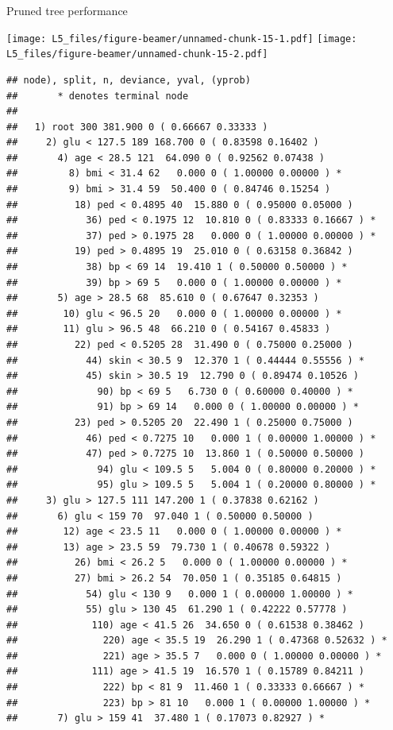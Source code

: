 \documentclass[
  ignorenonframetext,
]{beamer}
\begin{document}
\begin{frame}[fragile]

\begin{block}{Pruned tree performance}

\texttt{[image: L5\_files/figure-beamer/unnamed-chunk-15-1.pdf]}
\texttt{[image: L5\_files/figure-beamer/unnamed-chunk-15-2.pdf]}

\begin{verbatim}
## node), split, n, deviance, yval, (yprob)
##       * denotes terminal node
## 
##   1) root 300 381.900 0 ( 0.66667 0.33333 )  
##     2) glu < 127.5 189 168.700 0 ( 0.83598 0.16402 )  
##       4) age < 28.5 121  64.090 0 ( 0.92562 0.07438 )  
##         8) bmi < 31.4 62   0.000 0 ( 1.00000 0.00000 ) *
##         9) bmi > 31.4 59  50.400 0 ( 0.84746 0.15254 )  
##          18) ped < 0.4895 40  15.880 0 ( 0.95000 0.05000 )  
##            36) ped < 0.1975 12  10.810 0 ( 0.83333 0.16667 ) *
##            37) ped > 0.1975 28   0.000 0 ( 1.00000 0.00000 ) *
##          19) ped > 0.4895 19  25.010 0 ( 0.63158 0.36842 )  
##            38) bp < 69 14  19.410 1 ( 0.50000 0.50000 ) *
##            39) bp > 69 5   0.000 0 ( 1.00000 0.00000 ) *
##       5) age > 28.5 68  85.610 0 ( 0.67647 0.32353 )  
##        10) glu < 96.5 20   0.000 0 ( 1.00000 0.00000 ) *
##        11) glu > 96.5 48  66.210 0 ( 0.54167 0.45833 )  
##          22) ped < 0.5205 28  31.490 0 ( 0.75000 0.25000 )  
##            44) skin < 30.5 9  12.370 1 ( 0.44444 0.55556 ) *
##            45) skin > 30.5 19  12.790 0 ( 0.89474 0.10526 )  
##              90) bp < 69 5   6.730 0 ( 0.60000 0.40000 ) *
##              91) bp > 69 14   0.000 0 ( 1.00000 0.00000 ) *
##          23) ped > 0.5205 20  22.490 1 ( 0.25000 0.75000 )  
##            46) ped < 0.7275 10   0.000 1 ( 0.00000 1.00000 ) *
##            47) ped > 0.7275 10  13.860 1 ( 0.50000 0.50000 )  
##              94) glu < 109.5 5   5.004 0 ( 0.80000 0.20000 ) *
##              95) glu > 109.5 5   5.004 1 ( 0.20000 0.80000 ) *
##     3) glu > 127.5 111 147.200 1 ( 0.37838 0.62162 )  
##       6) glu < 159 70  97.040 1 ( 0.50000 0.50000 )  
##        12) age < 23.5 11   0.000 0 ( 1.00000 0.00000 ) *
##        13) age > 23.5 59  79.730 1 ( 0.40678 0.59322 )  
##          26) bmi < 26.2 5   0.000 0 ( 1.00000 0.00000 ) *
##          27) bmi > 26.2 54  70.050 1 ( 0.35185 0.64815 )  
##            54) glu < 130 9   0.000 1 ( 0.00000 1.00000 ) *
##            55) glu > 130 45  61.290 1 ( 0.42222 0.57778 )  
##             110) age < 41.5 26  34.650 0 ( 0.61538 0.38462 )  
##               220) age < 35.5 19  26.290 1 ( 0.47368 0.52632 ) *
##               221) age > 35.5 7   0.000 0 ( 1.00000 0.00000 ) *
##             111) age > 41.5 19  16.570 1 ( 0.15789 0.84211 )  
##               222) bp < 81 9  11.460 1 ( 0.33333 0.66667 ) *
##               223) bp > 81 10   0.000 1 ( 0.00000 1.00000 ) *
##       7) glu > 159 41  37.480 1 ( 0.17073 0.82927 ) *
\end{verbatim}


\end{block}
\end{frame}
\end{document}
